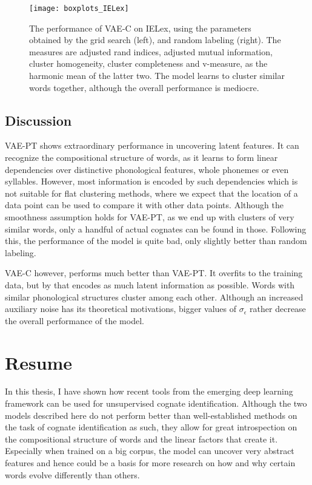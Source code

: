 \documentclass[6pt]{article}
\begin{document}
 \begin{figure}[h!] 
     \texttt{[image: boxplots\_IELex]} 
     \caption{The performance of VAE-C on IELex, using the parameters obtained by the grid search (left), and random labeling (right). The measures are adjusted rand indices, adjusted mutual information, cluster homogeneity, cluster completeness and v-measure, as the harmonic mean of the latter two. The model learns to cluster similar words together, although the overall performance is mediocre.}
    \label{fig:boxplots_IELex} 
\end{figure}


\subsection{Discussion}

VAE-PT shows extraordinary performance in uncovering latent features. It can recognize the compositional structure of words, as it learns to form linear dependencies over distinctive phonological features, whole phonemes or even syllables. However, most information is encoded by such dependencies which is not suitable for flat clustering methods, where we expect that the location of a data point can be used to compare it with other data points. Although the smoothness assumption holds for VAE-PT, as we end up with clusters of very similar words, only a handful of actual cognates can be found in those. Following this, the performance of the model is quite bad, only slightly better than random labeling. 

VAE-C however, performs much better than VAE-PT. It overfits to the training data, but by that encodes as much latent information as possible. Words with similar phonological structures cluster among each other. Although an increased auxiliary noise has its theoretical motivations, bigger values of $\sigma_{\epsilon}$ rather decrease the overall performance of the model. 
\section{Resume}

In this thesis, I have shown how recent tools from the emerging deep learning framework can be used for unsupervised cognate identification. Although the two models described here do not perform better than well-established methods on the task of cognate identification as such, they allow for great introspection on the compositional structure of words and the linear factors that create it. Especially when trained on a big corpus, the model can uncover very abstract features and hence could be a basis for more research on how and why certain words evolve differently than others. 
\end{document}
